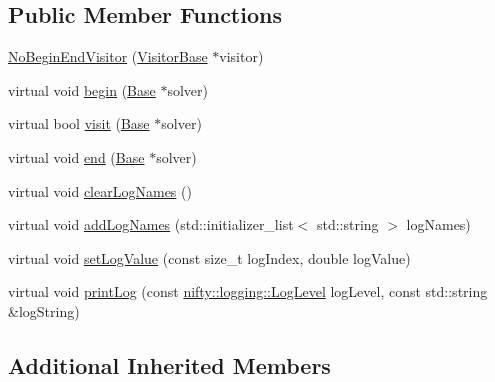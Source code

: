 \subsection*{Public Member Functions}
\begin{DoxyCompactItemize}
\item 
\hyperlink{classnifty_1_1graph_1_1ChainedSolvers_1_1NoBeginEndVisitor_a0a4a81bbe62321cc7ad9ddb0fb2bbce1}{No\+Begin\+End\+Visitor} (\hyperlink{classnifty_1_1graph_1_1ChainedSolvers_a1f90d20ae903cad5e6434d4019b28463}{Visitor\+Base} $\ast$visitor)
\item 
virtual void \hyperlink{classnifty_1_1graph_1_1ChainedSolvers_1_1NoBeginEndVisitor_a1b4038cfb9b71ef9f268de30185160dc}{begin} (\hyperlink{classnifty_1_1graph_1_1ChainedSolvers_af3c13fd5bc8d12ef88678d8191886f1a}{Base} $\ast$solver)
\item 
virtual bool \hyperlink{classnifty_1_1graph_1_1ChainedSolvers_1_1NoBeginEndVisitor_a2807662294ecbfc382b2eb12408807e3}{visit} (\hyperlink{classnifty_1_1graph_1_1ChainedSolvers_af3c13fd5bc8d12ef88678d8191886f1a}{Base} $\ast$solver)
\item 
virtual void \hyperlink{classnifty_1_1graph_1_1ChainedSolvers_1_1NoBeginEndVisitor_a5abf0364b8ce8e121550bcfc6cf7c730}{end} (\hyperlink{classnifty_1_1graph_1_1ChainedSolvers_af3c13fd5bc8d12ef88678d8191886f1a}{Base} $\ast$solver)
\item 
virtual void \hyperlink{classnifty_1_1graph_1_1ChainedSolvers_1_1NoBeginEndVisitor_a017575c11860cd9b61c3091bb416768c}{clear\+Log\+Names} ()
\item 
virtual void \hyperlink{classnifty_1_1graph_1_1ChainedSolvers_1_1NoBeginEndVisitor_a283634aac1a554877312ab47f71fbc00}{add\+Log\+Names} (std\+::initializer\+\_\+list$<$ std\+::string $>$ log\+Names)
\item 
virtual void \hyperlink{classnifty_1_1graph_1_1ChainedSolvers_1_1NoBeginEndVisitor_a464dd2c0fafcba73e7213d6de7bf1d75}{set\+Log\+Value} (const size\+\_\+t log\+Index, double log\+Value)
\item 
virtual void \hyperlink{classnifty_1_1graph_1_1ChainedSolvers_1_1NoBeginEndVisitor_a3967b78d88b8b9769ef4e70357d05598}{print\+Log} (const \hyperlink{namespacenifty_1_1logging_a3385625f9a0dbb17f70c47d3fca2f64d}{nifty\+::logging\+::\+Log\+Level} log\+Level, const std\+::string \&log\+String)
\end{DoxyCompactItemize}
\subsection*{Additional Inherited Members}


